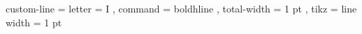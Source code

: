 \documentclass{PurdueThesis}
\begin{document}
\NiceMatrixOptions
  {
    custom-line = 
     {
       letter = I , %
       command = boldhline , %
       total-width = 1 pt , 
       tikz = { line width = 1 pt } 
     }
  }
  

\maketitle



%
%

%












\makeatletter
    {%
        \list
        {%
        }%
        {%
            \setlength{\bibhang}{0pt}%
            \setlength{\itemindent}{0pt}%
            \setlength{\itemsep}{\bibitemsep}%
            \setlength{\leftmargin}{0pt}%
            \setlength{\parsep}{\bibparsep}%
            \setlength{\rightmargin}{0.33in}%
        }%
    }
    {\endlist}
    {\item}
\makeatother
\end{document}
